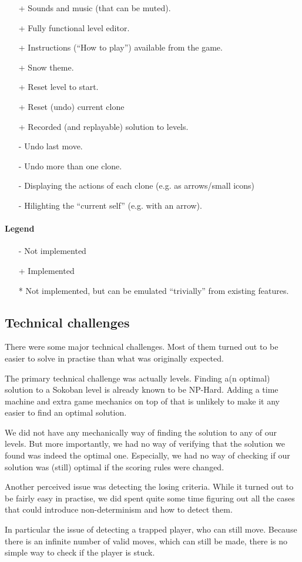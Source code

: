 \begin{itemize}
\item[+] Sounds and music (that can be muted).
\item[+] Fully functional level editor.
\item[+] Instructions (``How to play'') available from the game.
\item[+] Snow theme.
\item[+] Reset level to start.
\item[+] Reset (undo) current clone
\item[+] Recorded (and replayable) solution to levels.
\item[-] Undo last move.
\item[-] Undo more than one clone.
\item[-] Displaying the actions of each clone (e.g. as arrows/small icons)
\item[-] Hilighting the ``current self'' (e.g. with an arrow).
\end{itemize}

\paragraph{Legend}
\begin{itemize}
\item[-] Not implemented
\item[+] Implemented
\item[*] Not implemented, but can be emulated ``trivially'' from existing
 features.
\end{itemize}

\subsection{Technical challenges}
There were some major technical challenges.  Most of them turned out to be
easier to solve in practise than what was originally expected.

The primary technical challenge was actually levels.  Finding a(n
optimal) solution to a Sokoban level is already known to be NP-Hard.
Adding a time machine and extra game mechanics on top of that is
unlikely to make it any easier to find an optimal solution.

We did not have any mechanically way of finding the solution to any of
our levels.  But more importantly, we had no way of verifying that the
solution we found was indeed the optimal one.  Especially, we had no
way of checking if our solution was (still) optimal if the scoring rules
were changed.

Another perceived issue was detecting the losing criteria.  While it
turned out to be fairly easy in practise, we did spent quite some time
figuring out all the cases that could introduce non-determinism and
how to detect them.

In particular the issue of detecting a trapped player, who can still
move. Because there is an infinite number of valid moves, which can
still be made, there is no simple way to check if the player is stuck.

